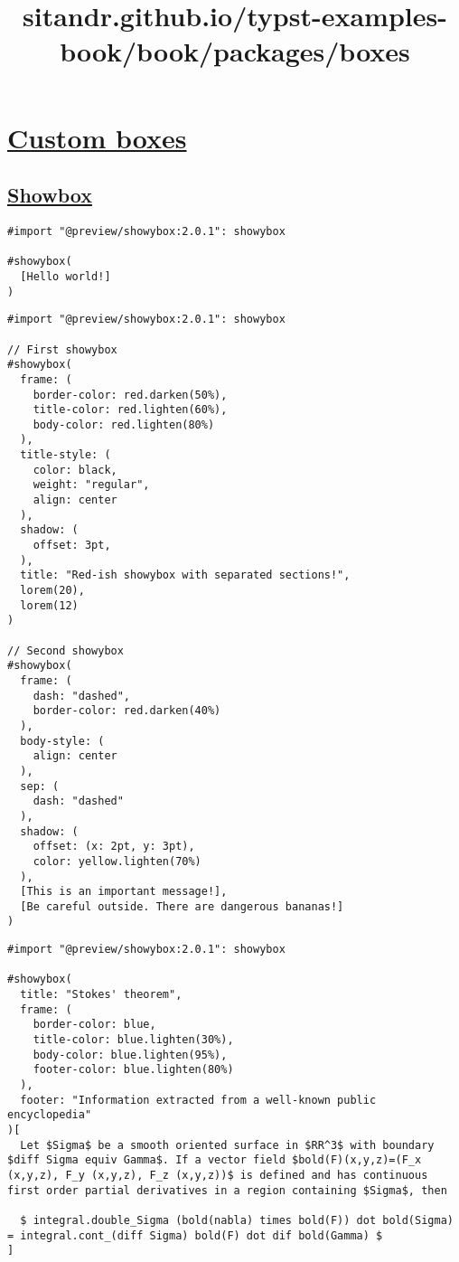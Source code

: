 \title{sitandr.github.io/typst-examples-book/book/packages/boxes}

\section{\texorpdfstring{\hyperref[custom-boxes]{Custom
boxes}}{Custom boxes}}\label{custom-boxes}

\subsection{\texorpdfstring{\hyperref[showbox]{Showbox}}{Showbox}}\label{showbox}

\begin{verbatim}
#import "@preview/showybox:2.0.1": showybox

#showybox(
  [Hello world!]
)
\end{verbatim}

\pandocbounded{}

\begin{verbatim}
#import "@preview/showybox:2.0.1": showybox

// First showybox
#showybox(
  frame: (
    border-color: red.darken(50%),
    title-color: red.lighten(60%),
    body-color: red.lighten(80%)
  ),
  title-style: (
    color: black,
    weight: "regular",
    align: center
  ),
  shadow: (
    offset: 3pt,
  ),
  title: "Red-ish showybox with separated sections!",
  lorem(20),
  lorem(12)
)

// Second showybox
#showybox(
  frame: (
    dash: "dashed",
    border-color: red.darken(40%)
  ),
  body-style: (
    align: center
  ),
  sep: (
    dash: "dashed"
  ),
  shadow: (
    offset: (x: 2pt, y: 3pt),
    color: yellow.lighten(70%)
  ),
  [This is an important message!],
  [Be careful outside. There are dangerous bananas!]
)
\end{verbatim}

\pandocbounded{}

\begin{verbatim}
#import "@preview/showybox:2.0.1": showybox

#showybox(
  title: "Stokes' theorem",
  frame: (
    border-color: blue,
    title-color: blue.lighten(30%),
    body-color: blue.lighten(95%),
    footer-color: blue.lighten(80%)
  ),
  footer: "Information extracted from a well-known public encyclopedia"
)[
  Let $Sigma$ be a smooth oriented surface in $RR^3$ with boundary $diff Sigma equiv Gamma$. If a vector field $bold(F)(x,y,z)=(F_x (x,y,z), F_y (x,y,z), F_z (x,y,z))$ is defined and has continuous first order partial derivatives in a region containing $Sigma$, then

  $ integral.double_Sigma (bold(nabla) times bold(F)) dot bold(Sigma) = integral.cont_(diff Sigma) bold(F) dot dif bold(Gamma) $
]
\end{verbatim}

